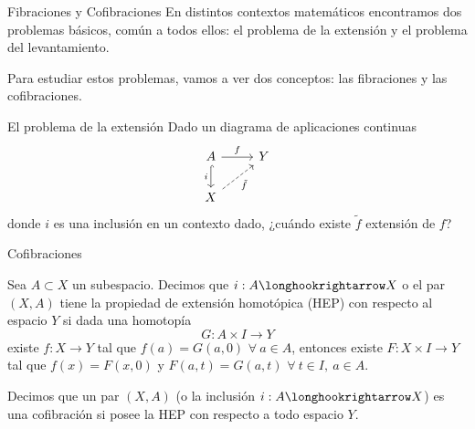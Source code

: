 \begin{frame}{Fibraciones y Cofibraciones}
En distintos contextos matemáticos encontramos dos problemas básicos, común a todos ellos: el problema de la extensión y el problema del levantamiento. \par
\vspace{1em}
Para estudiar estos problemas, vamos a ver dos conceptos: las fibraciones y las cofibraciones.
\end{frame}


\begin{frame}[fragile]{El problema de la extensión}
Dado un diagrama de aplicaciones continuas 
\[
\begin{tikzcd}
	A \rar{f} \dar[hook, swap]{i} & Y \\
	X \urar[dashed, swap]{\tilde{f}}	&
\end{tikzcd} 
\]
donde $i$ es una inclusión en un contexto dado, ¿cuándo existe $\tilde{f}$ extensión de $f$? 
\end{frame}



\begin{frame}[fragile]{Cofibraciones}
\begin{defin}
Sea $A \subset X$ un subespacio. Decimos que $i : A \longhookrightarrow X$ o el par $(X, A)$ tiene la \alert{propiedad de extensión homotópica} (HEP) con respecto al espacio $Y$ si dada una homotopía
\[ G : A \times I \longrightarrow Y \]
existe $f: X \longrightarrow Y $ tal que $f(a) = G(a, 0)$ $\forall \ a \in A$, entonces existe $F : X \times I \longrightarrow Y$ tal que $f(x) = F(x,0)$ y $F(a,t) = G(a, t)$ $\forall \ t \in I, \ a \in A$.
\end{defin}
\pause
\begin{defin}
Decimos que un par $(X,A)$ (o la inclusión $i: A \longhookrightarrow X$) es una \alert{cofibración} si posee la HEP con respecto a todo espacio $Y$. \par 
\end{defin}
\end{frame}

